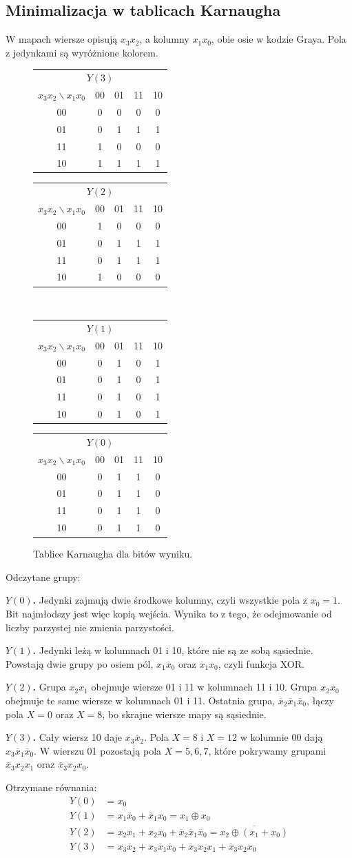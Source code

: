 \documentclass[11pt,a4paper]{article}
\newcommand{\nx}[1]{\overline{x}_{#1}}
\newcommand{\jj}{\cellcolor{pwr!18}1}
\newcommand{\kmap}[5]{%
  \begin{tabular}{c|cccc}
    \multicolumn{5}{c}{\textbf{#1}}\\[2pt]
    $x_3x_2 \backslash x_1x_0$ & 00 & 01 & 11 & 10\\ \hline
    00 & #2\\
    01 & #3\\
    11 & #4\\
    10 & #5
  \end{tabular}}
\begin{document}
\subsection{Minimalizacja w tablicach Karnaugha}

W mapach wiersze opisują $x_3x_2$, a kolumny $x_1x_0$, obie osie w kodzie Graya. Pola z jedynkami są wyróżnione kolorem.

\begin{figure}[H]
\centering
\small
\kmap{$Y(3)$}{0&0&0&0}{0&\jj&\jj&\jj}{\jj&0&0&0}{\jj&\jj&\jj&\jj}
\hspace{2em}
\kmap{$Y(2)$}{\jj&0&0&0}{0&\jj&\jj&\jj}{0&\jj&\jj&\jj}{\jj&0&0&0}
\\[1.2em]
\kmap{$Y(1)$}{0&\jj&0&\jj}{0&\jj&0&\jj}{0&\jj&0&\jj}{0&\jj&0&\jj}
\hspace{2em}
\kmap{$Y(0)$}{0&\jj&\jj&0}{0&\jj&\jj&0}{0&\jj&\jj&0}{0&\jj&\jj&0}
\caption{Tablice Karnaugha dla bitów wyniku.}
\end{figure}

Odczytane grupy:

\textbf{$Y(0)$.} Jedynki zajmują dwie środkowe kolumny, czyli wszystkie pola z $x_0 = 1$. Bit najmłodszy jest więc kopią wejścia. Wynika to z tego, że odejmowanie od liczby parzystej nie zmienia parzystości.

\textbf{$Y(1)$.} Jedynki leżą w kolumnach 01 i 10, które nie są ze sobą sąsiednie. Powstają dwie grupy po osiem pól, $x_1\nx{0}$ oraz $\nx{1}x_0$, czyli funkcja XOR.

\textbf{$Y(2)$.} Grupa $x_2x_1$ obejmuje wiersze 01 i 11 w kolumnach 11 i 10. Grupa $x_2x_0$ obejmuje te same wiersze w kolumnach 01 i 11. Ostatnia grupa, $\nx{2}\nx{1}\nx{0}$, łączy pola $X = 0$ oraz $X = 8$, bo skrajne wiersze mapy są sąsiednie.

\textbf{$Y(3)$.} Cały wiersz 10 daje $x_3\nx{2}$. Pola $X = 8$ i $X = 12$ w kolumnie 00 dają $x_3\nx{1}\nx{0}$. W wierszu 01 pozostają pola $X = 5, 6, 7$, które pokrywamy grupami $\nx{3}x_2x_1$ oraz $\nx{3}x_2x_0$.

Otrzymane równania:
\begin{align*}
Y(0) &= x_0\\
Y(1) &= x_1\nx{0} + \nx{1}x_0 = x_1 \oplus x_0\\
Y(2) &= x_2x_1 + x_2x_0 + \nx{2}\nx{1}\nx{0} = \overline{x_2 \oplus (x_1 + x_0)}\\
Y(3) &= x_3\nx{2} + x_3\nx{1}\nx{0} + \nx{3}x_2x_1 + \nx{3}x_2x_0
\end{align*}
\end{document}
